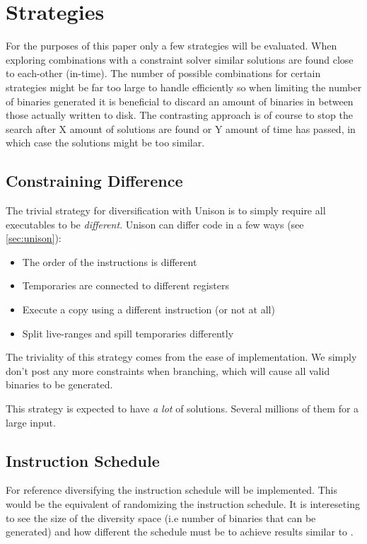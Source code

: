 \section{Strategies}

For the purposes of this paper only a few strategies will be evaluated. When exploring
combinations with a constraint solver similar solutions are found close to each-other (in-time).
The number of possible combinations for certain strategies might be far too large to handle
efficiently so when limiting the number of binaries generated it is beneficial to discard
an amount of binaries in between those actually written to disk. The contrasting approach
is of course to stop the search after X amount of solutions are found or Y amount of time
has passed, in which case the solutions might be too similar.


\subsection{Constraining Difference}

The trivial strategy for diversification with Unison is to simply require all executables
to be \textit{different}. Unison can differ code in a few ways (see \ref{sec:unison}):

\begin{itemize}
	\item The order of the instructions is different
	\item Temporaries are connected to different registers
	\item Execute a copy using a different instruction (or not at all)
	\item Split live-ranges and spill temporaries differently
\end{itemize}

The triviality of this strategy comes from the ease of implementation. We simply don't post
any more constraints when branching, which will cause all valid binaries to be generated.

This strategy is expected to have \textit{a lot} of solutions. Several millions of them
for a large input.
\subsection{Instruction Schedule}

For reference diversifying the instruction schedule will be implemented. This would be
the equivalent of randomizing the instruction schedule. It is intereseting to see the size
of the diversity space (i.e number of binaries that can be generated) and how different the
schedule must be to achieve results similar to \textcite{large-scale-automaed}.

